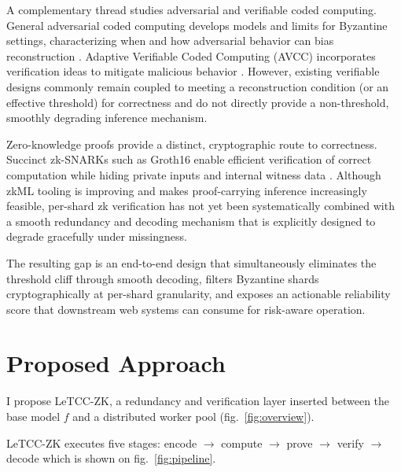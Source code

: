 \documentclass[sigconf]{acmart}
\begin{document}
A complementary thread studies adversarial and verifiable coded computing. General adversarial coded computing develops models and limits for Byzantine settings, characterizing when and how adversarial behavior can bias reconstruction \cite{moradi2025adversarial}. Adaptive Verifiable Coded Computing (AVCC) incorporates verification ideas to mitigate malicious behavior \cite{tang2021avcc}. However, existing verifiable designs commonly remain coupled to meeting a reconstruction condition (or an effective threshold) for correctness and do not directly provide a non-threshold, smoothly degrading inference mechanism.

Zero-knowledge proofs provide a distinct, cryptographic route to correctness. Succinct zk-SNARKs such as Groth16 enable efficient verification of correct computation while hiding private inputs and internal witness data \cite{groth2016}. Although zkML tooling is improving and makes proof-carrying inference increasingly feasible, per-shard zk verification has not yet been systematically combined with a smooth redundancy and decoding mechanism that is explicitly designed to degrade gracefully under missingness.

The resulting gap is an end-to-end design that simultaneously eliminates the threshold cliff through smooth decoding, filters Byzantine shards cryptographically at per-shard granularity, and exposes an actionable reliability score that downstream web systems can consume for risk-aware operation.



\section{Proposed Approach}
I propose LeTCC-ZK, a redundancy and verification layer inserted between the base model $f$ and a distributed worker pool (fig.~\ref{fig:overview}).

LeTCC-ZK executes five stages: encode $\to$ compute $\to$ prove $\to$ verify $\to$ decode which is shown on fig.~\ref{fig:pipeline}.
\end{document}
